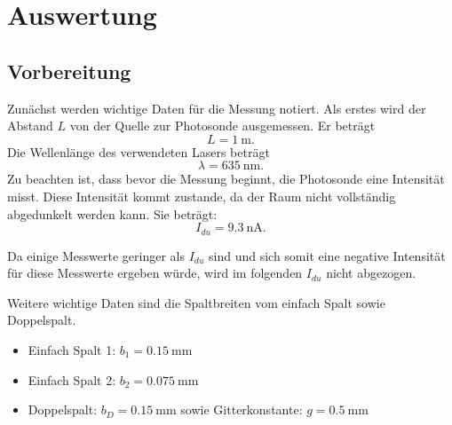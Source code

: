 \section{Auswertung}
\subsection{Vorbereitung}
Zunächst werden wichtige Daten für die Messung notiert.
Als erstes wird der Abstand $L$ von der Quelle zur Photosonde ausgemessen.
Er beträgt
\begin{equation*}
  L = \SI{1}{\meter}.
\end{equation*}
Die Wellenlänge des verwendeten Lasers beträgt
\begin{equation*}
  \lambda = \SI{635}{\nano\meter}.
\end{equation*}
Zu beachten ist, dass bevor die Messung beginnt, die Photosonde eine
Intensität misst. Diese Intensität kommt zustande, da der Raum nicht vollständig
abgedunkelt werden kann.
Sie beträgt:
\begin{equation*}
  I_{du} = \SI{9.3}{\nano\ampere}.
\end{equation*}

Da einige Messwerte geringer als $I_{du}$ sind und sich somit eine negative
Intensität für diese Messwerte ergeben würde, wird im folgenden $I_{du}$ nicht
abgezogen.

Weitere wichtige Daten sind die Spaltbreiten vom einfach Spalt sowie Doppelspalt.
\begin{itemize}
  \item Einfach Spalt 1: $ b_1 = \SI{0.15}{\milli\metre}$
  \item Einfach Spalt 2: $ b_2 = \SI{0.075}{\milli\metre}$
  \item Doppelspalt: $ b_D = \SI{0.15}{\milli\metre}$ sowie Gitterkonstante: $g = \SI{0.5}{\milli\metre}$
\end{itemize}
